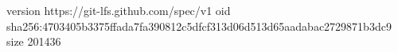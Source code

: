 version https://git-lfs.github.com/spec/v1
oid sha256:4703405b3375ffada7fa390812c5dfcf313d06d513d65aadabac2729871b3dc9
size 201436
